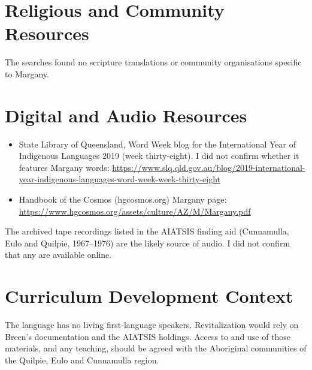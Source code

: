 \documentclass[12pt]{article}
\begin{document}
\section{Religious and Community Resources}
The searches found no scripture translations or community organisations specific to Margany.

\section{Digital and Audio Resources}
\begin{itemize}
\item State Library of Queensland, Word Week blog for the International Year of Indigenous Languages 2019 (week thirty-eight). I did not confirm whether it features Margany words: \url{https://www.slq.qld.gov.au/blog/2019-international-year-indigenous-languages-word-week-week-thirty-eight}
\item Handbook of the Cosmos (hgcosmos.org) Margany page: \url{https://www.hgcosmos.org/assets/culture/AZ/M/Margany.pdf}
\end{itemize}
The archived tape recordings listed in the AIATSIS finding aid (Cunnamulla, Eulo and Quilpie, 1967--1976) are the likely source of audio. I did not confirm that any are available online.

\section{Curriculum Development Context}
The language has no living first-language speakers. Revitalization would rely on Breen's documentation and the AIATSIS holdings. Access to and use of those materials, and any teaching, should be agreed with the Aboriginal communities of the Quilpie, Eulo and Cunnamulla region.
\end{document}
